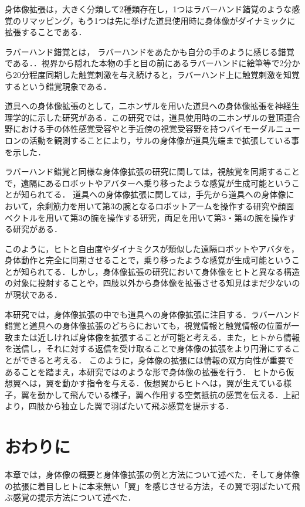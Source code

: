     身体像拡張は，大きく分類して2種類存在し，1つはラバーハンド錯覚\cite{botvinick1998rubber}のような感覚のリマッピング，もう1つは先に挙げた道具使用時に身体像がダイナミックに拡張することである．

    ラバーハンド錯覚とは， ラバーハンドをあたかも自分の手のように感じる錯覚である．．視界から隠れた本物の手と目の前にあるラバーハンドに絵筆等で2分から20分程度同期した触覚刺激を与え続けると，ラバーハンド上に触覚刺激を知覚するという錯覚現象である．

    道具への身体像拡張のとして，二ホンザルを用いた道具への身体像拡張を神経生理学的に示した研究がある\cite{iriki1996coding}．この研究では，道具使用時の二ホンザルの登頂連合野における手の体性感覚受容やと手近傍の視覚受容野を持つバイモーダルニューロンの活動を観測することにより，サルの身体像が道具先端まで拡張している事を示した．

    ラバーハンド錯覚と同様な身体像拡張の研究に関しては，視触覚を同期することで，遠隔にあるロボットやアバターへ乗り移ったような感覚が生成可能ということが知られてる\cite{舘201533_215}\cite{iwadare2017thirdarm}．
    道具への身体像拡張に関しては，手先から道具への身体像において，余剰筋力を用いて第3の腕となるロボットアームを操作する研究\cite{iwadare2017thirdarm}\cite{岩垂真哉2016余剰筋力を用いた第三の腕ロボットの操縦}や顔面ベクトルを用いて第3の腕を操作する研究\cite{iwasaki2017research}，両足を用いて第3・第4の腕を操作する研究がある\cite{sasaki2017metalimbs}．
    
    このように，ヒトと自由度やダイナミクスが類似した遠隔ロボットやアバタを，身体動作と完全に同期させることで，乗り移ったような感覚が生成可能ということが知られてる．しかし，身体像拡張の研究において身体像をヒトと異なる構造の対象に投射することや，四肢以外から身体像を拡張させる知見はまだ少ないのが現状である．


    本研究では，身体像拡張の中でも道具への身体像拡張に注目する．ラバーハンド錯覚と道具への身体像拡張のどちらにおいても，視覚情報と触覚情報の位置が一致または近しければ身体像を拡張することが可能と考える．また，ヒトから情報を送信し，それに対する返信を受け取ることで身体像の拡張をより円滑にすることができると考える．
    このように，身体像の拡張には情報の双方向性が重要であることを踏まえ，本研究ではのような形で身体像の拡張を行う．
    ヒトから仮想翼へは，翼を動かす指令を与える．仮想翼からヒトへは，翼が生えている様子，翼を動かして飛んでいる様子，翼へ作用する空気抵抗の感覚を伝える．上記より，四肢から独立した翼で羽ばたいて飛ぶ感覚を提示する．\\


\section{おわりに}
    本章では，身体像の概要と身体像拡張の例と方法について述べた．そして身体像の拡張に着目しヒトに本来無い「翼」を感じさせる方法，その翼で羽ばたいて飛ぶ感覚の提示方法について述べた．
    
